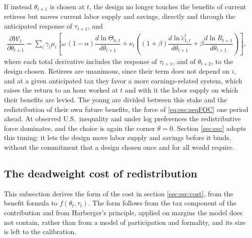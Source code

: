 If instead $\theta_{t+1}$ is chosen at $t$, the design no longer touches the benefits of current retirees but moves current labor supply and savings, directly and through the anticipated response of $\tau_{t+1}$, and
\begin{align}\label{eq:esc:leadFOC}
   \dfrac{\partial \mathcal{W}_t}{\partial \theta_{t+1}} = \sum_i\gamma_i\mu_i\left[\omega\,(1-\alpha)\dfrac{d\ln\Theta_{h,t}}{d\theta_{t+1}} + \nu_t\left((1+\beta)\dfrac{d\ln\tilde{c}_{1,t}^i}{d\theta_{t+1}} + \beta\dfrac{d\ln R_{t+1}}{d\theta_{t+1}}\right)\right],
\end{align}
where each total derivative includes the response of $\tau_{t+1}$, and of $\theta_{t+2}$, to the design chosen. Retirees are unanimous, since their term does not depend on $i$, and at a given anticipated tax they favor a more earnings-related system, which raises the return to an hour worked at $t$ and with it the labor supply on which their benefits are levied. The young are divided between this stake and the redistribution of their own future benefits, the force of \eqref{eq:esc:seqFOC} one period ahead. At observed U.S.\ inequality and under log preferences the redistributive force dominates, and the choice is again the corner $\theta = 0$. Section \ref{sec:esc} adopts this timing: it lets the design move labor supply and savings before it binds, without the commitment that a design chosen once and for all would require.

\subsection{The deadweight cost of redistribution}\label{app:esc:cost}
This subsection derives the form of the cost in section \ref{sec:esc:cost}, from the benefit formula to $f(\theta_t,\tau_t)$. The form follows from the tax component of the contribution and from Harberger's principle, applied on margins the model does not contain, rather than from a model of participation and formality, and its size is left to the calibration.

